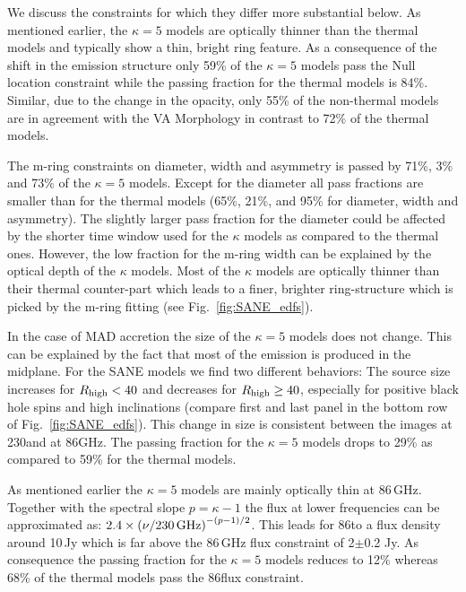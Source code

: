 We discuss the constraints for which they differ more substantial below.
As mentioned earlier, the $\kappa=5$ models are optically thinner than the thermal models and typically show a thin, bright ring feature. As a consequence of the shift in the emission structure only 59\% of the $\kappa=5$ models pass the Null location constraint while the passing fraction for the thermal models is 84\%. Similar, due to the change in the opacity, only 55\% of the non-thermal models are in agreement with the VA Morphology in contrast to 72\% of the thermal models.


The m-ring constraints on diameter, width and asymmetry is passed by 71\%, 3\% and 73\% of the $\kappa=5$ models. Except for the diameter all pass fractions are smaller than for the thermal models (65\%, 21\%, and 95\% for diameter, width and asymmetry). The slightly larger pass fraction for the diameter could be affected by the shorter time window used for the $\kappa$ models as compared to the thermal ones. However, the low fraction for the m-ring width can be explained by the optical depth of the $\kappa$ models. Most of the $\kappa$ models are optically thinner than their thermal counter-part which leads to a finer, brighter ring-structure which is picked by the m-ring fitting (see Fig.~\ref{fig:SANE_edfs}).


In the case of MAD accretion the size of the $\kappa=5$ models does not change. This can be explained by the fact that most of the emission is produced in the midplane. For the SANE models we find two different behaviors: The source size increases for $R_{\rm high}<40$ and decreases for $R_{\rm high}\geq 40$, especially for positive black hole spins and high inclinations (compare first and last panel in the bottom row of Fig.~\ref{fig:SANE_edfs}). This change in size is consistent between the images at 230\GHz and at 86GHz. The passing fraction for the $\kappa=5$ models drops to 29\% as compared to 59\% for the thermal models.


As mentioned earlier the $\kappa=5$ models are mainly optically thin at 86\,GHz. Together with the spectral slope $p=\kappa-1$ the flux at lower frequencies can be approximated as: $2.4\times \left(\nu/230\,\rm{GHz}\right)^{-(p-1)/2}$. This leads for 86\GHz to a flux density around 10\,Jy which is far above the 86\,GHz flux constraint of 2$\pm$0.2 Jy. As consequence the passing fraction for the $\kappa=5$ models reduces to 12\% whereas 68\% of the thermal models pass the 86\GHz flux constraint.

